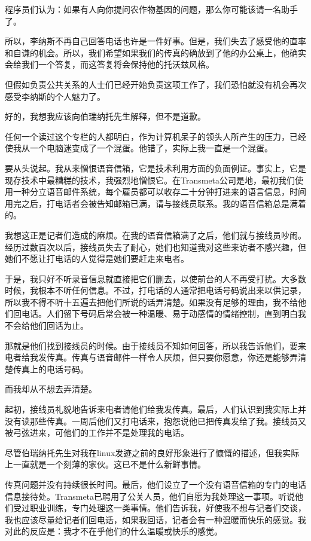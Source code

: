 程序员们认为：如果有人向你提问农作物基因的问题，那么你可能该请一名助手了。

所以，李纳斯不再自己回答电话也许是一件好事。但是，我们失去了感受他的直率和自谦的机会。所以，我们希望如果我们的传真的确放到了他的办公桌上，他确实会给我们一个答复，而这答复将会保持他的托沃兹风格。

但假如负责公共关系的人士们已经开始负责这项工作了，我们恐怕就没有机会再次感受李纳斯的个人魅力了。

 

好的，我想我应该向伯瑞纳托先生解释，但不是道歉。

任何一个读过这个专栏的人都明白，作为计算机呆子的领头人所产生的压力，已经使我从一个电脑迷变成了一个混蛋。他错了，实际上我一直是一个混蛋。

要从头说起。我从来憎恨语音信箱，它是技术利用方面的负面例证。事实上，它是现存技术中最糟糕的技术，我强烈地憎恨它。在Transmeta公司是地，最初我们使用一种分立语音邮件系统，每个雇员都可以收存二十分钟打进来的语言信息，时间用完之后，打电话者会被告知邮箱已满，请与接线员联系。我的语音信箱总是满着的。

我想这正是记者们造成的麻烦。在我的语音信箱满了之后，他们就与接线员吵闹。经历过数百次以后，接线员失去了耐心，她们也知道我对这些来访者不感兴趣，但她们不愿让打电话的人觉得是她们要赶走来电者。

于是，我只好不听录音信息就直接把它们删去，以使前台的人不再受打扰。大多数时候，我根本不听任何信息。不过，打电话的人通常把电话号码说出来以供记录，所以我不得不听十五遍去把他们所说的话弄清楚。如果没有足够的理由，我不给他们回电话。人们留下号码后常会被一种温暖、易于动感情的情绪控制，直到明白我不会给他们回话为止。

那就是他们找到接线员的时候。由于接线员不知如何回答，所以我告诉他们，要来电者给我发传真。传真与语音邮件一样令人厌烦，但只要你愿意，你还是能够弄清楚传真上的电话号码。

而我却从不想去弄清楚。

起初，接线员礼貌地告诉来电者请他们给我发传真。最后，人们认识到我实际上并没有读那些传真。一周后他们又打电话来，抱怨说他已把传真发给了我。接线员又被弓弦进来，可他们的工作并不是处理我的电话。

尽管伯瑞纳托先生对我在linux发迹之前的良好形象进行了慷慨的描述，但我实际上一直就是一个刻薄的家伙。这已不是什么新鲜事情。

传真问题并没有持续很长时间。最后，他们设立了一个没有语音信箱的专门的电话信息接待处。Transmeta已聘用了公关人员，他们自愿为我处理这一事项。听说他们受过职业训练，专门处理这一类事情。他们告诉我，好使我不想与记者们交谈，我也应该尽量给记者们回电话，如果我回话，记者会有一种温暖而快乐的感觉。我对此的反应是：我才不在乎他们的什么温暖或快乐的感觉。

